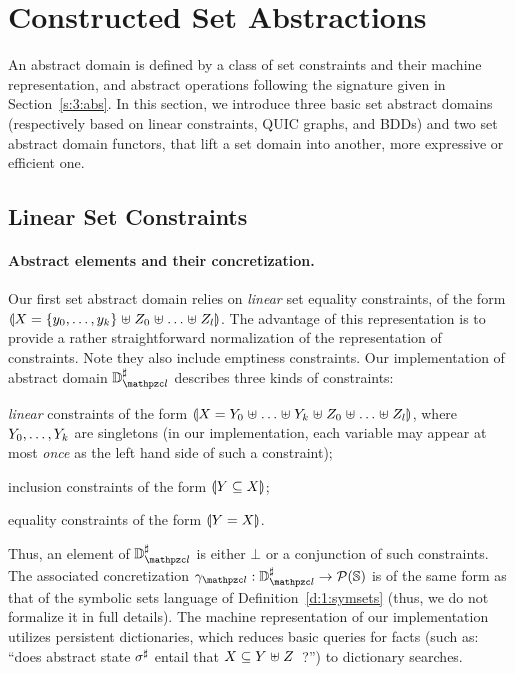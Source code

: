 \section{Constructed Set Abstractions}
\label{sec:constructed} \label{s:4:domains}
An abstract domain is defined by a class of set constraints and their machine
representation, and abstract operations following the signature given in
Section~\ref{s:3:abs}.
In this section, we introduce three basic set abstract domains (respectively
based on linear constraints, QUIC graphs, and BDDs) and two set abstract
domain functors, that lift a set domain into another, more expressive or
efficient one.

\subsection{Linear Set Constraints}
\label{s:4:1:lin}
\newcommand{\adomlin}{\adom_{\zcl}}
\newcommand{\gammalin}{\gamma_{\zcl}}
\paragraph{Abstract elements and their concretization.}
Our first set abstract domain relies on {\em linear} set equality
constraints, of the form \( \llparenthesis X = \{ y_0, \ldots, y_k \} \mathrel{\uplus}
  Z_0 \mathrel{\uplus} \ldots \mathrel{\uplus} Z_l \rrparenthesis \).
The advantage of this representation is to provide a rather straightforward
normalization of the representation of constraints.
Note they also include emptiness constraints.
Our implementation of abstract domain \( \adomlin \) describes three kinds
of constraints:
\begin{compactitem}
\item {\em linear} constraints of the form \( \llparenthesis X = Y_0
    \mathrel{\uplus} \ldots \mathrel{\uplus} Y_k \mathrel{\uplus} Z_0 \mathrel{\uplus} \ldots
    \mathrel{\uplus} Z_l \rrparenthesis \), where \( Y_0, \ldots, Y_k \) are
  singletons (in our implementation, each variable may appear at most
  {\em once} as the left hand side of such a constraint);
\item inclusion constraints of the form \( \llparenthesis Y \subseteq X \rrparenthesis \);
\item equality constraints of the form \( \llparenthesis Y = X \rrparenthesis \).
\end{compactitem}
Thus, an element of \( \adomlin \) is either \( \bot \) or a conjunction of
such constraints.
The associated concretization \( \gammalin: \adomlin \rightarrow
\partsof{\states} \) is of the same form as that of the symbolic sets
language of Definition~\ref{d:1:symsets} (thus, we do not formalize it
in full details).
The machine representation of our implementation utilizes persistent
dictionaries, which reduces basic queries for facts (such as: ``does
abstract state \( {\sigma}^{\sharp} \) entail that \( X \subseteq Y
\mathrel{\uplus} Z \)~?'') to dictionary searches.

